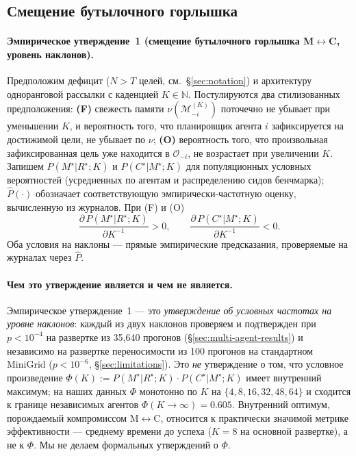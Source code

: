 \documentclass{article}
\begin{document}
\subsection{Смещение бутылочного горлышка}
\label{sec:shift}

\paragraph{Эмпирическое утверждение~1 (смещение бутылочного горлышка M$\leftrightarrow$C, уровень наклонов).}
Предположим дефицит ($N > T$ целей, см.\ \S\ref{sec:notation}) и
архитектуру одноранговой рассылки с каденцией $K \in \mathbb{N}$. Постулируются два
стилизованных предположения:
\textbf{(F)} свежесть памяти $\nu(\mathcal{M}_{-i}^{(K)})$
поточечно не убывает при уменьшении $K$, и вероятность того, что
планировщик агента $i$ зафиксируется на достижимой цели, не убывает по
$\nu$;
\textbf{(O)} вероятность того, что произвольная зафиксированная цель
уже находится в $\mathcal{O}_{-i}$, не возрастает при увеличении $K$.
Запишем $P(M^\star|R^\star;K)$ и $P(C^\star|M^\star;K)$ для
популяционных условных вероятностей (усредненных по агентам и
распределению сидов бенчмарка); $\hat{P}(\cdot)$ обозначает
соответствующую эмпирически-частотную оценку, вычисленную из журналов. При
(F) и (O)
\[
\frac{\partial\, P(M^\star|R^\star;K)}{\partial K^{-1}} > 0,
\qquad
\frac{\partial\, P(C^\star|M^\star;K)}{\partial K^{-1}} < 0.
\]
Оба условия на наклоны --- прямые эмпирические предсказания,
проверяемые на журналах через $\hat{P}$.

\paragraph{Чем это утверждение является и чем не является.}
Эмпирическое утверждение~1 --- это \emph{утверждение об условных частотах на уровне наклонов}: каждый из двух наклонов проверяем и подтвержден при $p<10^{-4}$ на развертке из 35{,}640 прогонов (\S\ref{sec:multi-agent-results}) и независимо на развертке переносимости из 100 прогонов на стандартном MiniGrid ($p<10^{-6}$, \S\ref{sec:limitations}). Это \emph{не} утверждение о том, что условное произведение $\Phi(K) := P(M^\star|R^\star;K)\!\cdot\! P(C^\star|M^\star;K)$ имеет внутренний максимум; на наших данных $\Phi$ монотонно по $K$ на $\{4,8,16,32,48,64\}$ и сходится к границе независимых агентов $\Phi(K\!\to\!\infty){=}0.605$. Внутренний оптимум, порождаемый компромиссом M$\leftrightarrow$C, относится к практически значимой метрике эффективности --- среднему времени до успеха ($K{=}8$ на основной развертке), а не к $\Phi$. Мы не делаем формальных утверждений о $\Phi$.
\end{document}
